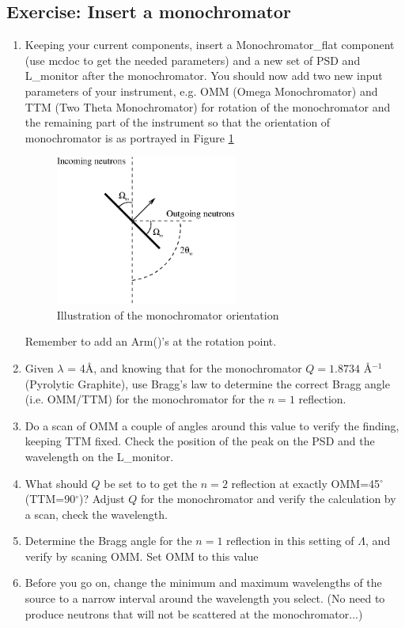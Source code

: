 \documentclass[a4paper]{article}
\begin{document}
\subsection{Exercise: Insert a monochromator}
\begin{enumerate}
\item{Keeping your current components, insert a Monochromator\_flat
component (use mcdoc to get the needed parameters) and a
new set of PSD and L\_monitor after the monochromator. You should now add
two new input parameters of your instrument, e.g. OMM (Omega
Monochromator) and TTM (Two Theta Monochromator)
for rotation of the monochromator and the remaining part of the 
instrument so that the orientation of
monochromator is as portrayed in Figure \ref{mono.eps}
\begin{figure}[htb!]
\begin{center}
\includegraphics[width=6cm]{pics/mono.eps}
\end{center}
\caption{Illustration of the monochromator orientation}
\label{mono.eps}
\end{figure}
Remember to add an Arm()'s at the rotation point. }
\item{Given $\lambda$ = 4\AA, and knowing that for the
monochromator $Q=1.8734$ \AA$^{-1}$ (Pyrolytic Graphite), use Bragg's law to determine the 
correct Bragg angle (i.e. OMM/TTM) for the monochromator for the $n=1$ reflection. }
\item{Do a scan of OMM a couple of angles around this value to verify
    the finding, keeping TTM fixed. Check the position of the peak on
    the PSD and the wavelength on the L\_monitor. }
\item{What should $Q$ be set to to get the $n=2$ reflection at exactly
    OMM=45$^\circ$ (TTM=90$^\circ$)?
Adjust $Q$ for the monochromator and verify the calculation by a
scan, check the wavelength. }
\item{Determine the Bragg angle for the $n=1$ reflection in this
setting of $\Lambda$, and verify by scaning OMM. Set OMM to this value}
\item{Before you go on, change the minimum and maximum wavelengths of
    the source to a narrow interval around the wavelength you select. (No need to
    produce neutrons that will not be scattered at the monochromator...)}
\end{enumerate}
\end{document}

